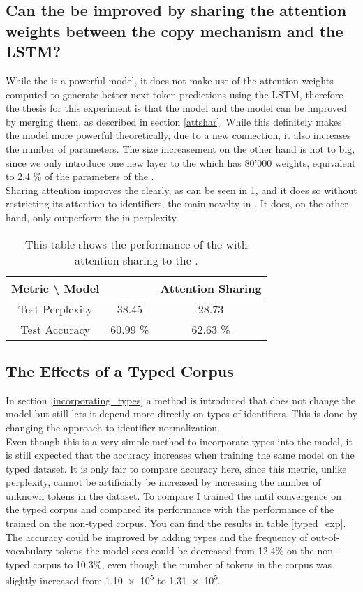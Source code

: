 \documentclass[11pt]{article}
\begin{document}
\subsection{Can the \spn be improved by sharing the attention weights between the copy mechanism and the LSTM?}
\label{attshar_results}
While the \spn is a powerful model, it does not make use of the attention weights computed to generate better next-token predictions using the LSTM, therefore the thesis for this experiment is that the \spn model and the \lmatt model can be improved by merging them, as described in section \ref{attshar}. While this definitely makes the model more powerful theoretically, due to a new connection, it also increases the number of parameters. The size increasement on the other hand is not to big, since we only introduce one new layer to the \spn which has 80'000 weights, equivalent to 2.4 \% of the parameters of the \spn.\\
Sharing attention improves the \spn clearly, as can be seen in \ref{attshar_table}, and it does so without restricting its attention to identifiers, the main novelty in \cite{bhoopchand2016learning}. It does, on the other hand, only outperform the \lmatt in perplexity.
\begin{table}
\centering
	\begin{tabular}{c | c | c}
		Metric \textbackslash{} Model & \spn & Attention Sharing\\\hline
		Test Perplexity & 38.45 & 28.73	\\\hline
		Test Accuracy & 60.99 \% & 62.63 \%
	\end{tabular}
\label{attshar_table}
\caption{This table shows the performance of the \spn with attention sharing to the \spn.}
\end{table}


\subsection{The Effects of a Typed Corpus}
In section \ref{incorporating_types} a method is introduced that does not change the model but still lets it depend more directly on types of identifiers. This is done by changing the approach to identifier normalization.\\
Even though this is a very simple method to incorporate types into the model, it is still expected that the accuracy increases when training the same model on the typed dataset. It is only fair to compare accuracy here, since this metric, unlike perplexity, cannot be artificially be increased by increasing the number of unknown tokens in the dataset. To compare I trained the \spn until convergence on the typed corpus and compared its performance with the performance of the \spn trained on the non-typed corpus. You can find the results in table \ref{typed_exp}. The accuracy could be improved by adding types and the frequency of out-of-vocabulary tokens the model sees could be decreased from 12.4\% on the non-typed corpus to 10.3\%, even though the number of tokens in the corpus was slightly increased from \num{1.10e5} to \num{1.31e5}.
\end{document}
